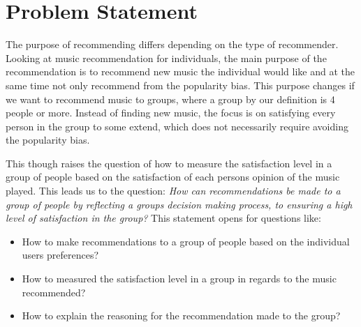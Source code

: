 \section{Problem Statement}
The purpose of recommending differs depending on the type of recommender. Looking at music recommendation for individuals, the main purpose of the recommendation is to recommend new music the individual would like and at the same time not only recommend from the popularity bias. This purpose changes if we want to recommend music to groups, where a group by our definition is 4 people or more. Instead of finding new music, the focus is on satisfying every person in the group to some extend, which does not necessarily require avoiding the popularity bias. 

This though raises the question of how to measure the satisfaction level in a group of people based on the satisfaction of each persons opinion of the music played. This leads us to the question: 
\textit{How can recommendations be made to a group of people by reflecting a groups decision making process, to ensuring a high level of satisfaction in the group?} This statement opens for questions like:
\begin{itemize}
\item How to make recommendations to a group of people based on the individual users preferences?
\item How to measured the satisfaction level in a group in regards to the music recommended?
\item How to explain the reasoning for the recommendation made to the group? 
\end{itemize}